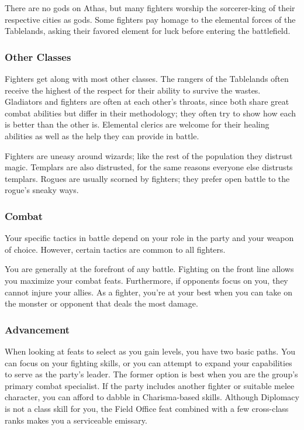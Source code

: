There are no gods on Athas, but many fighters worship the sorcerer-king of their respective cities as gods. Some fighters pay homage to the elemental forces of the Tablelands, asking their favored element for luck before entering the battlefield.

\subsubsection{Other Classes}

Fighters get along with most other classes. The rangers of the Tablelands often receive the highest of the respect for their ability to survive the wastes. Gladiators and fighters are often at each other's throats, since both share great combat abilities but differ in their methodology; they often try to show how each is better than the other is. Elemental clerics are welcome for their healing abilities as well as the help they can provide in battle.

Fighters are uneasy around wizards; like the rest of the population they distrust magic. Templars are also distrusted, for the same reasons everyone else distrusts templars. Rogues are usually scorned by fighters; they prefer open battle to the rogue's sneaky ways.

\subsubsection{Combat}

Your specific tactics in battle depend on your role in the party and your weapon of choice. However, certain tactics are common to all fighters.

You are generally at the forefront of any battle. Fighting on the front line allows you maximize your combat feats. Furthermore, if opponents focus on you, they cannot injure your allies. As a fighter, you're at your best when you can take on the monster or opponent that deals the most damage.

\subsubsection{Advancement}

When looking at feats to select as you gain levels, you have two basic paths. You can focus on your fighting skills, or you can attempt to expand your capabilities to serve as the party's leader. The former option is best when you are the group's primary combat specialist. If the party includes another fighter or suitable melee character, you can afford to dabble in Charisma-based skills. Although Diplomacy is not a class skill for you, the Field Office feat combined with a few cross-class ranks makes you a serviceable emissary.


